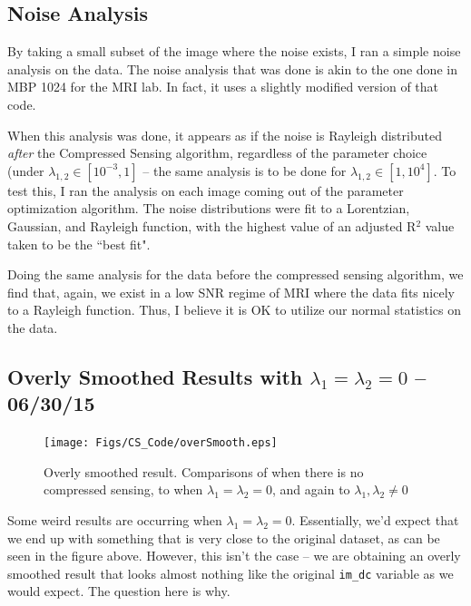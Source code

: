 \documentclass[11 pt]{article}
\begin{document}
  \subsection{Noise Analysis}
    By taking a small subset of the image where the noise exists, I ran a simple noise analysis on the data. The noise analysis that was done is akin to the one done in MBP 1024 for the MRI lab. In fact, it uses a slightly modified version of that code. 

    When this analysis was done, it appears as if the noise is Rayleigh distributed \emph{after} the Compressed Sensing algorithm, regardless of the parameter choice (under $\lambda_{1,2} \in [10^{-3},1]$ -- the same analysis is to be done for $\lambda_{1,2} \in [1, 10^4]$. To test this, I ran the analysis on each image coming out of the parameter optimization algorithm. The noise distributions were fit to a Lorentzian, Gaussian, and Rayleigh function, with the highest value of an adjusted R$^2$ value taken to be the ``best fit".

    Doing the same analysis for the data before the compressed sensing algorithm, we find that, again, we exist in a low SNR regime of MRI where the data fits nicely to a Rayleigh function. Thus, I believe it is OK to utilize our normal statistics on the data. 

  \subsection{Overly Smoothed Results with $\lambda_1 = \lambda_2 = 0$ -- 06/30/15}

    \begin{figure}[!ht] 
      \centering
      \vspace{0pt}
      \setlength\fboxsep{0pt}
      \setlength\fboxrule{0.5pt}
      \texttt{[image: Figs/CS\_Code/overSmooth.eps]}
      \caption{Overly smoothed result. Comparisons of when there is no compressed sensing, to when $\lambda_1 = \lambda_2 = 0$, and again to $\lambda_1,\lambda_2 \neq 0$}
      \label{fig:overSmooth}
      \end{figure}

    Some weird results are occurring when $\lambda_1 = \lambda_2 = 0$. Essentially, we'd expect that we end up with something that is very close to the original dataset, as can be seen in the figure above. However, this isn't the case -- we are obtaining an overly smoothed result that looks almost nothing like the original \texttt{im\_dc}
    variable as we would expect. The question here is why. 
\end{document}
